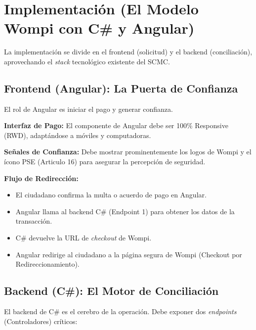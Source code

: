 \section{Implementación (El Modelo Wompi con C\# y Angular)}
La implementación se divide en el frontend (solicitud) y el backend (conciliación), aprovechando el \textit{stack} tecnológico existente del SCMC.

\subsection{Frontend (Angular): La Puerta de Confianza}
El rol de Angular es iniciar el pago y generar confianza.

\textbf{Interfaz de Pago:} El componente de Angular debe ser 100\% Responsive (RWD), adaptándose a móviles y computadoras.

\textbf{Señales de Confianza:} Debe mostrar prominentemente los logos de Wompi y el ícono PSE (Articulo 16) para asegurar la percepción de seguridad.

\textbf{Flujo de Redirección:}
\begin{itemize}
    \item El ciudadano confirma la multa o acuerdo de pago en Angular.
    \item Angular llama al backend C\# (Endpoint 1) para obtener los datos de la transacción.
    \item C\# devuelve la URL de \textit{checkout} de Wompi.
    \item Angular redirige al ciudadano a la página segura de Wompi (Checkout por Redireccionamiento).
\end{itemize}

\subsection{Backend (C\#): El Motor de Conciliación}
El backend de C\# es el cerebro de la operación. Debe exponer dos \textit{endpoints} (Controladores) críticos:

